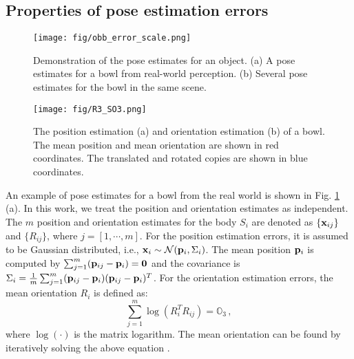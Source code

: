 \documentclass[conference]{IEEEtran}
\newcommand{\xx}{{\bf x}}
\newcommand{\pp}{{\bf p}}
\begin{document}
\subsection{Properties of pose estimation errors}

\begin{figure}[tb]
\centering
\texttt{[image: fig/obb\_error\_scale.png]}
\caption{Demonstration of the pose estimates for an object. (a) A pose estimates for a bowl from real-world perception. (b) Several pose estimates for the bowl in the same scene.  }
\label{fig:pose-estimation}
\end{figure}

\begin{figure}[tb]
\centering
\texttt{[image: fig/R3\_SO3.png]}
\caption{The position estimation (a) and orientation estimation (b) of a bowl. The mean position and mean orientation are shown in red coordinates. The translated and rotated copies are shown in blue coordinates. }
\label{fig:enter-label}
\end{figure}

An example of pose estimates for a bowl from the real world is shown in Fig. \ref{fig:pose-estimation} (a). In this work, we treat the position and orientation estimates as independent. The $m$ position and orientation estimates for the body $S_i$ are denoted as $\{\xx_{ij}\}$ and $\{R_{ij}\}$, where $j=[1,\cdots,m]$. 
For the position estimation errors, it is assumed to be Gaussian distributed, i.e., $\xx_i\sim \mathcal{N}(\pp_i, \Sigma_i)$. The mean position $\pp_i$ is computed by $\sum_{j=1}^m(\pp_{ij}-\pp_i)=\mathbf{0}$ and the covariance is $\Sigma_i = \frac{1}{m}\sum_{j=1}^m(\pp_{ij}-\pp_i)(\pp_{ij}-\pp_i)^T$. For the orientation estimation errors, the mean orientation $R_i$ is defined as:
$$
\sum_{j=1}^m \log(R_i^TR_{ij}) = \mathbb{O}_{3}\, ,
$$
where $\log(\cdot)$ is the matrix logarithm. The mean orientation can be found by iteratively solving the above equation \cite{ackerman2013probabilistic}.

\end{document}
